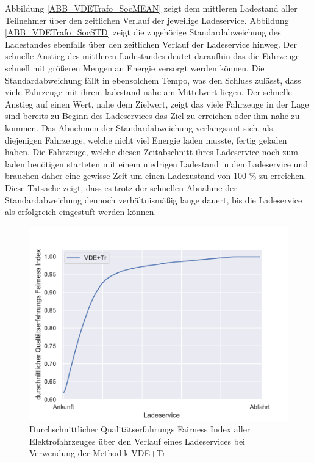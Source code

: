 Abbildung \ref{ABB_VDETrafo_SocMEAN} zeigt dem mittleren Ladestand aller Teilnehmer über den zeitlichen Verlauf der jeweilige Ladeservice. Abbildung \ref{ABB_VDETrafo_SocSTD} zeigt die zugehörige Standardabweichung des Ladestandes ebenfalls über den zeitlichen Verlauf der Ladeservice hinweg. Der schnelle Anstieg des mittleren Ladestandes deutet daraufhin das die Fahrzeuge schnell mit größeren Mengen an Energie versorgt werden können. Die Standardabweichung fällt in ebensolchem Tempo, was den Schluss zulässt, dass viele Fahrzeuge mit ihrem ladestand nahe am Mittelwert liegen. Der schnelle Anstieg auf einen Wert, nahe dem Zielwert, zeigt das viele Fahrzeuge in der Lage sind bereits zu Beginn des Ladeservices das Ziel zu erreichen oder ihm nahe zu kommen. Das Abnehmen der Standardabweichung verlangsamt sich, als diejenigen Fahrzeuge, welche nicht viel Energie laden musste, fertig geladen haben. Die Fahrzeuge, welche diesen Zeitabschnitt ihres Ladeservice noch zum laden benötigen starteten mit einem niedrigen Ladestand in den Ladeservice und brauchen daher eine gewisse Zeit um einen Ladezustand von 100 \% zu erreichen. Diese Tatsache zeigt, dass es trotz der schnellen Abnahme der Standardabweichung dennoch verhältnismäßig lange dauert, bis die Ladeservice als erfolgreich eingestuft werden können.
\begin{figure}[htb]
\centering
	\includegraphics[scale=0.45]{img/VDE_tau_trafo/tau_VDE_trafo_2_qoe.pdf}
	\caption{Durchschnittlicher Qualitätserfahrungs Fairness Index aller Elektrofahrzeuges über den Verlauf eines Ladeservices bei Verwendung der Methodik VDE+Tr}
	\label{Abb_VDETrafo_Fairness}
\end{figure}

